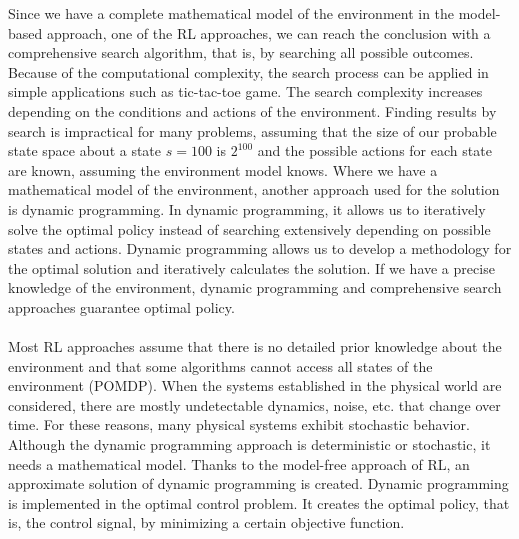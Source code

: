 \documentclass[12pt,twoside,a4]{mwbk}
\begin{document}
Since we have a complete mathematical model of the environment in the model-based approach, one of the RL approaches, we can reach the conclusion with a comprehensive search algorithm, that is, by searching all possible outcomes. Because of the computational complexity, the search process can be applied in simple applications such as tic-tac-toe game. The search complexity increases depending on the conditions and actions of the environment. Finding results by search is impractical for many problems, assuming that the size of our probable state space about a state $s = 100$ is $2^{100}$ and the possible actions for each state are known, assuming the environment model knows. Where we have a mathematical model of the environment, another approach used for the solution is dynamic programming. In dynamic programming, it allows us to iteratively solve the optimal policy instead of searching extensively depending on possible states and actions. Dynamic programming allows us to develop a methodology for the optimal solution and iteratively calculates the solution. If we have a precise knowledge of the environment, dynamic programming and comprehensive search approaches guarantee optimal policy. 
\\ \\
Most RL approaches assume that there is no detailed prior knowledge about the environment and that some algorithms cannot access all states of the environment (POMDP). When the systems established in the physical world are considered, there are mostly undetectable dynamics, noise, etc. that change over time. For these reasons, many physical systems exhibit stochastic behavior. Although the dynamic programming approach is deterministic or stochastic, it needs a mathematical model. Thanks to the model-free approach of RL, an approximate solution of dynamic programming is created. Dynamic programming is implemented in the optimal control problem. It creates the optimal policy, that is, the control signal, by minimizing a certain objective function.
\end{document}
